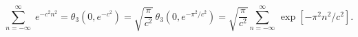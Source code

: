 \begin{equation}
\sum_{n=-\infty}^\infty\;e^{-c^2n^2}=\theta_3(0,e^{-c^2})
=\sqrt{\frac{\pi}{c^2}}\,\theta_3(0,e^{-\pi^2/c^2})=\sqrt{\frac{\pi}{c^2}}
\sum_{n=-\infty}^\infty\,\exp[-\pi^2n^2/c^2].
\label{poiss}
\end{equation}

